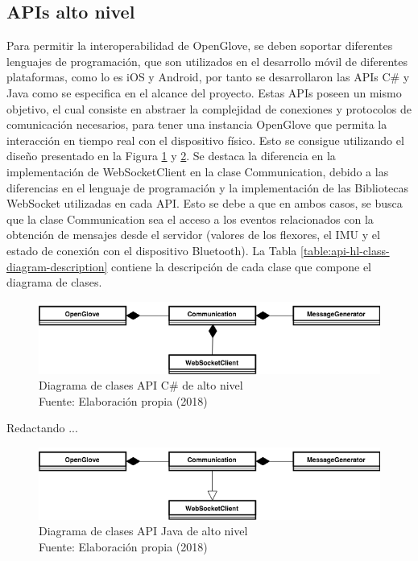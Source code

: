 \subsection{APIs alto nivel}
\label{subseccion-estructura-apis-hl}
Para permitir la interoperabilidad de OpenGlove, se deben soportar diferentes lenguajes de programación, que son utilizados en el desarrollo móvil de diferentes plataformas, como lo es iOS y Android, por tanto se desarrollaron las APIs C\# y Java como se especifica en el alcance del proyecto. Estas APIs poseen un mismo objetivo, el cual consiste en abstraer la complejidad de conexiones y protocolos de comunicación necesarios, para tener una instancia OpenGlove que permita la interacción en tiempo real con el dispositivo físico. Esto se consigue utilizando el diseño presentado en la Figura \ref{fig:api-csharp-hl} y \ref{fig:api-java-hl}. Se destaca la diferencia en la implementación de WebSocketClient en la clase Communication, debido a las diferencias en el lenguaje de programación y la implementación de las Bibliotecas WebSocket utilizadas en cada API. Esto se debe a que en ambos casos, se busca que la clase Communication sea el acceso a los eventos relacionados con la obtención de mensajes desde el servidor (valores de los flexores, el IMU y el estado de conexión con el dispositivo Bluetooth). La Tabla \ref{table:api-hl-class-diagram-description} contiene la descripción de cada clase que compone el diagrama de clases.


\begin{figure}[H]
  \begin{center} 
   	\includegraphics[width=1.0\textwidth]{images/chapter04/OpenGlove-Architecture-API-CSharp-HL.png} 
    \caption[Diagrama de clases API C\# de alto nivel]{Diagrama de clases API C\# de alto nivel \\Fuente: Elaboración propia (2018)}
    \label{fig:api-csharp-hl}
  \end{center}
\end{figure}


Redactando ...

\begin{figure}[H]
  \begin{center} 
   	\includegraphics[width=1.0\textwidth]{images/chapter04/OpenGlove-Architecture-API-Java-HL.png} 
    \caption[Diagrama de clases API Java de alto nivel]{Diagrama de clases API Java de alto nivel \\Fuente: Elaboración propia (2018)}
    \label{fig:api-java-hl}
  \end{center}
\end{figure}

